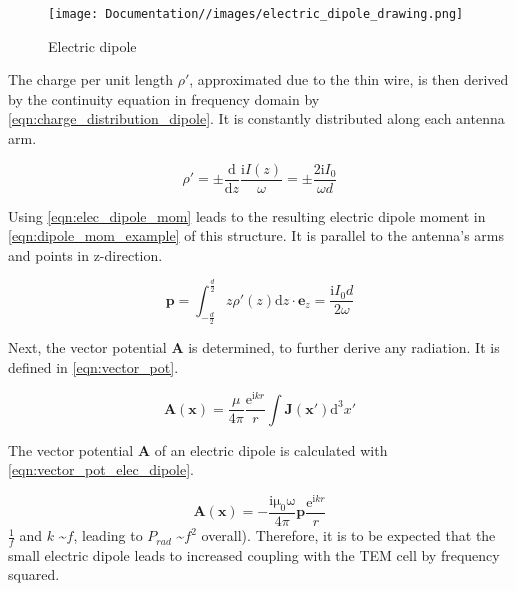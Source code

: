 \begin{figure}[h]
    \centering
    \texttt{[image: Documentation//images/electric\_dipole\_drawing.png]}
    \caption{Electric dipole}
    \label{fig:electric_dipole}
\end{figure}

The charge per unit length $\rho'$, approximated due to the thin wire, is then derived by the continuity equation in frequency domain by \autoref{eqn:charge_distribution_dipole}. It is constantly distributed along each antenna arm\cite{Griffiths_2024}\cite{Jackson}.

\begin{equation}
    \rho' = \pm\frac{\mathrm{d}}{\mathrm{d}z}\frac{\mathrm{i}I(z)}{\omega} = \pm\frac{2\mathrm{i}I_0}{\omega d}
    \label{eqn:charge_distribution_dipole}
\end{equation}

Using \autoref{eqn:elec_dipole_mom} leads to the resulting electric dipole moment in \autoref{eqn:dipole_mom_example} of this structure. It is parallel to the antenna's arms and points in z-direction\cite{Griffiths_2024}\cite{Jackson}. 

\begin{equation}
    \mathbf{p}=\int_{-\frac{d}{2}}^{\frac{d}{2}}z\rho'(z)\mathrm{d}z\cdot\mathbf{e}_z = \frac{\mathrm{i}I_0d}{2\omega}
    \label{eqn:dipole_mom_example}
\end{equation}

Next, the vector potential $\mathbf{A}$ is determined, to further derive any radiation. It is defined in \autoref{eqn:vector_pot}\cite{Balanis_1997}\cite{Jackson}. %

\begin{equation}
    \mathbf{A}(\mathbf{x})=\frac{\mu}{4\pi}\frac{\mathrm{e}^{\mathrm{i}kr}}{r}\int \mathbf{J}(\mathbf{x'})\mathrm{d}^3x'
    \label{eqn:vector_pot}
\end{equation}

The vector potential $\mathbf{A}$ of an electric dipole is calculated with \autoref{eqn:vector_pot_elec_dipole}\cite{Jackson}.

\begin{equation}
    \mathbf{A} (\mathbf{x})=-\frac{\mathrm{i\mu_0\omega}}{4\pi}\mathbf{p}\frac{\mathrm{e}^{\mathrm{i}kr}}{r}
    \label{eqn:vector_pot_elec_dipole}
\end{equation}
$\frac{1}{f}$ and $k$ \textasciitilde $f$, leading to $P_{rad}$ \textasciitilde $f^2$ overall)\cite{Jackson}. Therefore, it is to be expected that the small electric dipole leads to increased coupling with the TEM cell by frequency squared.

